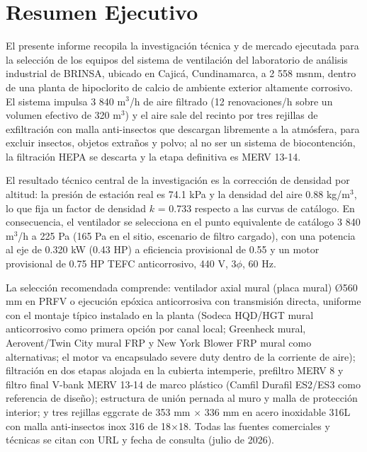 \newpage
\section*{Resumen Ejecutivo}

El presente informe recopila la investigación técnica y de mercado ejecutada para la selección de los equipos del sistema de ventilación del laboratorio de análisis industrial de BRINSA, ubicado en Cajicá, Cundinamarca, a 2 558 msnm, dentro de una planta de hipoclorito de calcio de ambiente exterior altamente corrosivo. El sistema impulsa 3 840 m$^3$/h de aire filtrado (12 renovaciones/h sobre un volumen efectivo de 320 m$^3$) y el aire sale del recinto por tres rejillas de exfiltración con malla anti-insectos que descargan libremente a la atmósfera, para excluir insectos, objetos extraños y polvo; al no ser un sistema de biocontención, la filtración HEPA se descarta y la etapa definitiva es MERV 13-14.

El resultado técnico central de la investigación es la corrección de densidad por altitud: la presión de estación real es 74.1 kPa y la densidad del aire 0.88 kg/m$^3$, lo que fija un factor de densidad $k$ = 0.733 respecto a las curvas de catálogo. En consecuencia, el ventilador se selecciona en el punto equivalente de catálogo 3 840 m$^3$/h a 225 Pa (165 Pa en el sitio, escenario de filtro cargado), con una potencia al eje de 0.320 kW (0.43 HP) a eficiencia provisional de 0.55 y un motor provisional de 0.75 HP TEFC anticorrosivo, 440 V, 3$\phi$, 60 Hz.

La selección recomendada comprende: ventilador axial mural (placa mural) Ø560 mm en PRFV o ejecución epóxica anticorrosiva con transmisión directa, uniforme con el montaje típico instalado en la planta (Sodeca HQD/HGT mural anticorrosivo como primera opción por canal local; Greenheck mural, Aerovent/Twin City mural FRP y New York Blower FRP mural como alternativas; el motor va encapsulado severe duty dentro de la corriente de aire); filtración en dos etapas alojada en la cubierta intemperie, prefiltro MERV 8 y filtro final V-bank MERV 13-14 de marco plástico (Camfil Durafil ES2/ES3 como referencia de diseño); estructura de unión pernada al muro y malla de protección interior; y tres rejillas eggcrate de 353 mm $\times$ 336 mm en acero inoxidable 316L con malla anti-insectos inox 316 de 18$\times$18. Todas las fuentes comerciales y técnicas se citan con URL y fecha de consulta (julio de 2026).

\newpage
